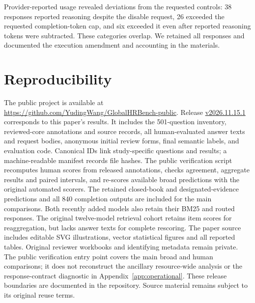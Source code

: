 \documentclass[11pt]{article}
\DeclareRobustCommand{\claim}[2]{#2}
\begin{document}
\claim{APPROBUST}{Provider-reported usage revealed deviations from the requested controls: 38 responses reported reasoning despite the disable request, 26 exceeded the requested completion-token cap, and six exceeded it even after reported reasoning tokens were subtracted. These categories overlap. We retained all responses and documented the execution amendment and accounting in the materials.}

\section{Reproducibility}
\claim{APPREPRO}{The public project is available at \url{https://github.com/YudingWang/GlobalHRBench-public}. Release \href{https://github.com/YudingWang/GlobalHRBench-public/releases/tag/v2026.11.15.1}{v2026.11.15.1} corresponds to this paper's results. It includes the 501-question inventory, reviewed-core annotations and source records, all \RNAudit{} human-evaluated answer texts and request bodies, \RNForms{} anonymous initial review forms, final semantic labels, and evaluation code. Canonical IDs link study-specific questions and results; a machine-readable manifest records file hashes.}
\claim{APPREPRO}{The public verification script recomputes human scores from released annotations, checks agreement, aggregate results and paired intervals, and re-scores available broad predictions with the original automated scorers. The retained closed-book and designated-evidence predictions and all 840 completion outputs are included for the main comparisons. Both recently added models also retain their BM25 and routed responses. The original twelve-model retrieval cohort retains item scores for reaggregation, but lacks answer texts for complete rescoring. The paper source includes editable SVG illustrations, vector statistical figures and all reported tables.}
\claim{APPREPRO}{Original reviewer workbooks and identifying metadata remain private. The public verification entry point covers the main broad and human comparisons; it does not reconstruct the ancillary resource-wide analysis or the response-contract diagnostic in Appendix~\ref{app:operational}. These release boundaries are documented in the repository. Source material remains subject to its original reuse terms.}
\end{document}
